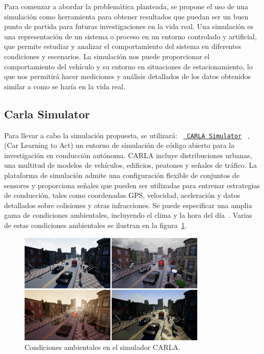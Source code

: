 
\noindent
Para comenzar a abordar la problemática planteada, se propone el uso de una simulación como herramienta para
obtener resultados que puedan ser un buen punto de partida para futuras investigaciones en la vida real.
Una simulación es una representación de un sistema o proceso en un entorno controlado y artificial,
que permite estudiar y analizar el comportamiento del sistema en diferentes condiciones y escenarios.
La simulación nos puede proporcionar el comportamiento del vehículo y su entorno en situaciones de estacionamiento,
lo que nos permitirá hacer mediciones y análisis detallados de los datos obtenidos similar a como se haría en la vida real.

\subsection{Carla Simulator}\label{subsec:carla-simulator}
\noindent
Para llevar a cabo la simulación propuesta, se utilizará: \texttt{%
    \href{https://github.com/carla-simulator/carla}{%
        CARLA Simulator}%
}
, (Car Learning to Act) un entorno de simulación de código abierto para la investigación en conducción autónoma.
\noindent
CARLA incluye distribuciones urbanas, una multitud de modelos de vehículos, edificios, peatones y señales de tráfico. La plataforma de simulación admite una configuración flexible de conjuntos de sensores y proporciona señales
que pueden ser utilizadas para entrenar estrategias de conducción, tales como coordenadas GPS, velocidad, aceleración y datos detallados sobre colisiones y otras infracciones. Se puede especificar una amplia gama de condiciones ambientales, incluyendo el clima y la hora del día~\cite{dosovitskiy2017carla}.
\noindent
Varias de estas condiciones ambientales se ilustran en la figura~\ref{fig:carla-simulator}.

\begin{figure}[!ht]
    \centering
    \includegraphics[width=0.8\textwidth]{img/carla_clima_example}
    \caption{Condiciones ambientales en el simulador CARLA.}
    \label{fig:carla-simulator}
\end{figure}


